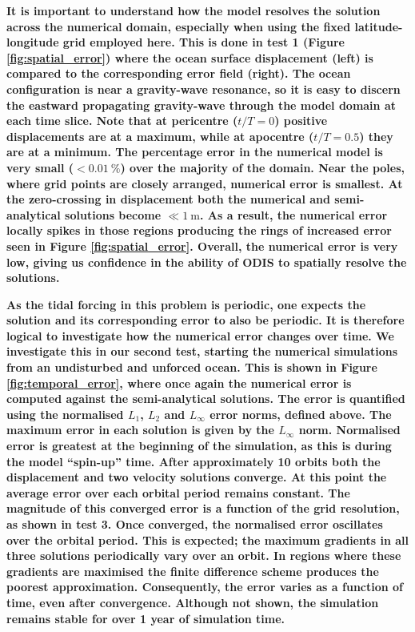 \textbf{It is important to understand how the model resolves the solution across the numerical domain, especially when using the fixed latitude-longitude grid employed here. This is done in test 1 (Figure \ref{fig:spatial_error}) where the ocean surface displacement (left) is compared to the corresponding error field (right). The ocean configuration is near a gravity-wave resonance, so it is easy to discern the eastward propagating gravity-wave through the model domain at each time slice. Note that at pericentre ($t/T = 0$) positive displacements are at a maximum, while at apocentre ($t/T = 0.5$) they are at a minimum. The percentage error in the numerical model is very small ($< \SI{0.01}{\percent}$) over the majority of the domain. Near the poles, where grid points are closely arranged, numerical error is smallest. At the zero-crossing in displacement both the numerical and semi-analytical solutions become $\ll \SI{1}{\metre}$. As a result, the numerical error locally spikes in those regions producing the rings of increased error seen in Figure \ref{fig:spatial_error}. Overall, the numerical error is very low, giving us confidence in the ability of ODIS to spatially resolve the solutions.}  

\textbf{As the tidal forcing in this problem is periodic, one expects the solution and its corresponding error to also be periodic. It is therefore logical to investigate how the numerical error changes over time. We investigate this in our second test, starting the numerical simulations from an undisturbed and unforced ocean. This is shown in Figure \ref{fig:temporal_error}, where once again the numerical error is computed against the \citet{matsuyama2014tidal} semi-analytical solutions. The error is quantified using the normalised $L_1$, $L_2$ and $L_{\infty}$ error norms, defined above. The maximum error in each solution is given by the $L_{\infty}$ norm. Normalised error is greatest at the beginning of the simulation, as this is during the model ``spin-up'' time. After approximately \num{10} orbits both the displacement and two velocity solutions converge. At this point the average error over each orbital period remains constant. The magnitude of this converged error is a function of the grid resolution, as shown in test 3. Once converged, the normalised error oscillates over the orbital period. This is expected; the maximum gradients in all three solutions periodically vary over an orbit. In regions where these gradients are maximised the finite difference scheme produces the poorest approximation. Consequently, the error varies as a function of time, even after convergence.  Although not shown, the simulation remains stable for over 1 year of simulation time. }

